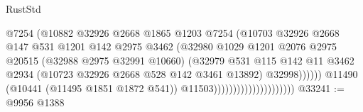 \begin{lexlean}{RustStd}
\begin{coremodule}
                                                  @7254
                                                  (@10882
                                                    @32926
                                                    @2668
                                                    @1865
                                                    @1203
                                                    @7254
                                                    (@10703
                                                      @32926
                                                      @2668
                                                      @147
                                                      @531
                                                      @1201
                                                      @142
                                                      @2975
                                                      @3462
                                                      (@32980
                                                        @1029
                                                        @1201
                                                        @2076
                                                        @2975
                                                        @20515
                                                        (@32988 @2975 @32991 @10660)
                                                        (@32979
                                                          @531
                                                          @115
                                                          @142
                                                          @11
                                                          @3462
                                                          @2934
                                                          (@10723
                                                            @32926
                                                            @2668
                                                            @528
                                                            @142
                                                            @3461
                                                            @13892)
                                                          @32998))))))
                                              @11490
                                              (@10441 (@11495 @1851 @1872 @541))
                                              @11503)))))))))))))))))))))
@33241 := @9956 @1388

\end{coremodule}
\end{lexlean}
